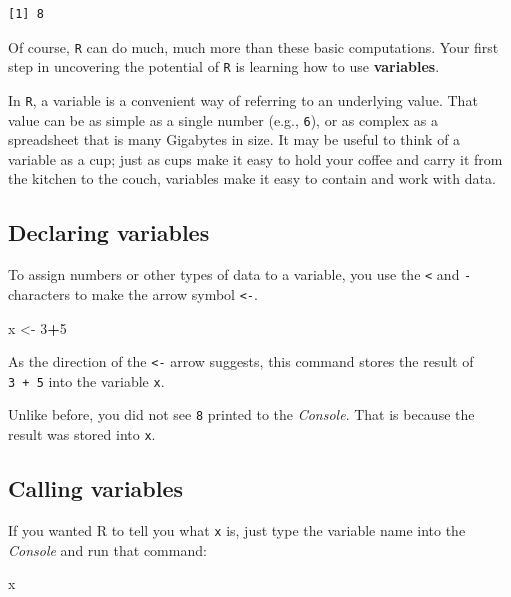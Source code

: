 \documentclass[
]{book}
\newenvironment{Shaded}{\begin{snugshade}}{\end{snugshade}}
\newcommand{\DecValTok}[1]{\textcolor[rgb]{0.00,0.00,0.81}{#1}}
\newcommand{\NormalTok}[1]{#1}
\newcommand{\OperatorTok}[1]{\textcolor[rgb]{0.81,0.36,0.00}{\textbf{#1}}}
\newcommand{\StringTok}[1]{\textcolor[rgb]{0.31,0.60,0.02}{#1}}
\begin{document}
\begin{verbatim}
[1] 8
\end{verbatim}

Of course, \texttt{R} can do much, much more than these basic computations. Your first step in uncovering the potential of \texttt{R} is learning how to use \textbf{variables}.

In \texttt{R}, a variable is a convenient way of referring to an underlying value. That value can be as simple as a single number (e.g., \texttt{6}), or as complex as a spreadsheet that is many Gigabytes in size. It may be useful to think of a variable as a cup; just as cups make it easy to hold your coffee and carry it from the kitchen to the couch, variables make it easy to contain and work with data.

\hypertarget{declaring-variables}{%
\subsection*{Declaring variables}\label{declaring-variables}}

To assign numbers or other types of data to a variable, you use the \texttt{\textless{}} and \texttt{-} characters to make the arrow symbol \texttt{\textless{}-}.

\begin{Shaded}
\begin{Highlighting}[]
\NormalTok{x <-}\StringTok{ }\DecValTok{3}\OperatorTok{+}\DecValTok{5}
\end{Highlighting}
\end{Shaded}

As the direction of the \texttt{\textless{}-} arrow suggests, this command stores the result of \texttt{3\ +\ 5} into the variable \texttt{x}.

Unlike before, you did not see \texttt{8} printed to the \emph{Console}. That is because the result was stored into \texttt{x}.

\hypertarget{calling-variables}{%
\subsection*{Calling variables}\label{calling-variables}}

If you wanted R to tell you what \texttt{x} is, just type the variable name into the \emph{Console} and run that command:

\begin{Shaded}
\begin{Highlighting}[]
\NormalTok{x}
\end{Highlighting}
\end{Shaded}
\end{document}
